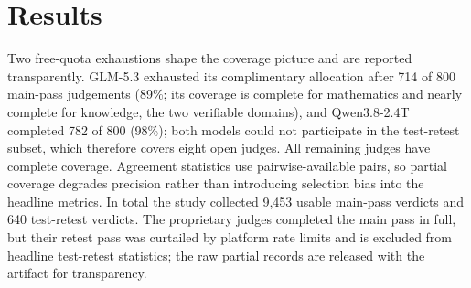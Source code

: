 \documentclass[review,12pt]{elsarticle}
\begin{document}
\section{Results}
\label{sec:results}

Two free-quota exhaustions shape the coverage picture and are reported
transparently. GLM-5.3 exhausted its complimentary allocation after 714 of
800 main-pass judgements (89\%; its coverage is complete for mathematics and
nearly complete for knowledge, the two verifiable domains), and
Qwen3.8-2.4T completed 782 of 800 (98\%); both models could not participate
in the test-retest subset, which therefore covers eight open judges. All
remaining judges have complete coverage. Agreement statistics use
pairwise-available pairs, so partial coverage degrades precision rather than
introducing selection bias into the headline metrics. In total the study
collected 9,453 usable main-pass verdicts and 640 test-retest verdicts.
The proprietary judges completed the main pass in full, but their retest
pass was curtailed by platform rate limits and is excluded from headline
test-retest statistics; the raw partial records are released with the
artifact for transparency.
\end{document}
